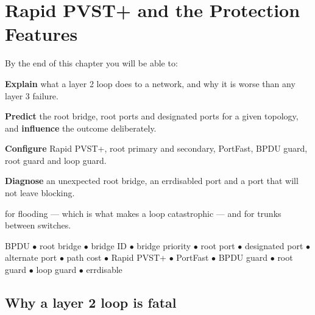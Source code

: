 \chapter{Rapid PVST+ and the Protection Features}\label{ch:stp}

\begin{outcomes}
By the end of this chapter you will be able to:
\begin{tight}
  \item \textbf{Explain} what a layer 2 loop does to a network, and why it is
        worse than any layer 3 failure.
  \item \textbf{Predict} the root bridge, root ports and designated ports for a
        given topology, and \textbf{influence} the outcome deliberately.
  \item \textbf{Configure} Rapid PVST+, root primary and secondary, PortFast,
        BPDU guard, root guard and loop guard.
  \item \textbf{Diagnose} an unexpected root bridge, an errdisabled port and a
        port that will not leave blocking.
\end{tight}
\end{outcomes}

\begin{prereq}
 for flooding --- which is what makes a loop catastrophic ---
and  for trunks between switches.
\end{prereq}

\begin{keyterms}
BPDU $\bullet$ root bridge $\bullet$ bridge ID $\bullet$ bridge priority
$\bullet$ root port $\bullet$ designated port $\bullet$ alternate port $\bullet$
path cost $\bullet$ Rapid PVST+ $\bullet$ PortFast $\bullet$ BPDU guard
$\bullet$ root guard $\bullet$ loop guard $\bullet$ errdisable
\end{keyterms}

\section{Why a layer 2 loop is fatal}

